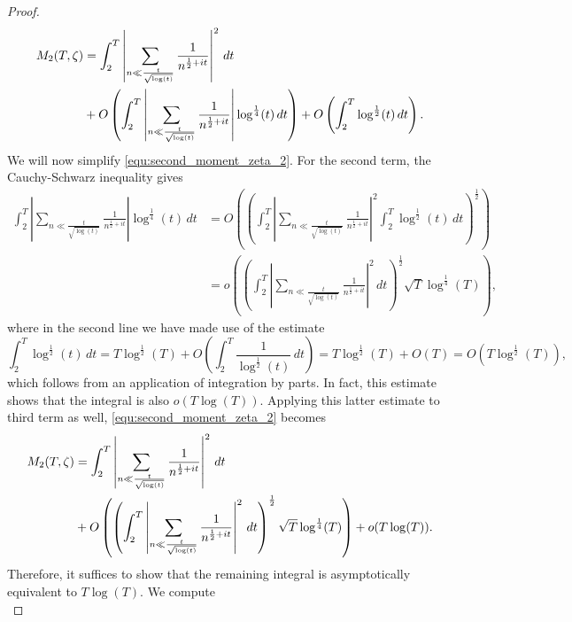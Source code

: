\begin{proof}
\begin{equation}
        \begin{aligned}
          M_{2}(T,\zeta) &= \int_{2}^{T}\left|\sum_{n \ll \frac{t}{\sqrt{\log(t)}}}\frac{1}{n^{\frac{1}{2}+it}}\right|^{2}\,dt \\
          &+ O\left(\int_{2}^{T}\left|\sum_{n \ll \frac{t}{\sqrt{\log(t)}}}\frac{1}{n^{\frac{1}{2}+it}}\right|\log^{\frac{1}{4}}(t)\,dt\right)+O\left(\int_{2}^{T}\log^{\frac{1}{2}}(t)\,dt\right).
        \end{aligned}
      \end{equation}
      We will now simplify \cref{equ:second_moment_zeta_2}. For the second term, the Cauchy-Schwarz inequality gives
      \begin{align*}
        \int_{2}^{T}\left|\sum_{n \ll \frac{t}{\sqrt{\log(t)}}}\frac{1}{n^{\frac{1}{2}+it}}\right|\log^{\frac{1}{4}}(t)\,dt &= O\left(\left(\int_{2}^{T}\left|\sum_{n \ll \frac{t}{\sqrt{\log(t)}}}\frac{1}{n^{\frac{1}{2}+it}}\right|^{2}\int_{2}^{T}\log^{\frac{1}{2}}(t)\,dt\right)^{\frac{1}{2}}\right) \\
        &= o\left(\left(\int_{2}^{T}\left|\sum_{n \ll \frac{t}{\sqrt{\log(t)}}}\frac{1}{n^{\frac{1}{2}+it}}\right|^{2}\,dt\right)^{\frac{1}{2}}\sqrt{T}\log^{\frac{1}{4}}(T)\right),
      \end{align*}
      where in the second line we have made use of the estimate
      \[
        \int_{2}^{T}\log^{\frac{1}{2}}(t)\,dt = T\log^{\frac{1}{2}}(T)+O\left(\int_{2}^{T}\frac{1}{\log^{\frac{1}{2}}(t)}\,dt\right) = T\log^{\frac{1}{2}}(T)+O(T) = O(T\log^{\frac{1}{2}}(T)),
      \]
      which follows from an application of integration by parts. In fact, this estimate shows that the integral is also $o(T\log(T))$. Applying this latter estimate to third term as well, \cref{equ:second_moment_zeta_2} becomes
      \begin{equation}\label{equ:second_moment_zeta_3}
        \begin{aligned}
          M_{2}(T,\zeta) &= \int_{2}^{T}\left|\sum_{n \ll \frac{t}{\sqrt{\log(t)}}}\frac{1}{n^{\frac{1}{2}+it}}\right|^{2}\,dt \\
          &+ O\left(\left(\int_{2}^{T}\left|\sum_{n \ll \frac{t}{\sqrt{\log(t)}}}\frac{1}{n^{\frac{1}{2}+it}}\right|^{2}\,dt\right)^{\frac{1}{2}}\sqrt{T}\log^{\frac{1}{4}}(T)\right)+o(T\log(T)).
        \end{aligned}
      \end{equation}
      Therefore, it suffices to show that the remaining integral is asymptotically equivalent to $T\log(T)$. We compute
      \begin{equation}\label{equ:second_moment_zeta_4}

\end{equation}
\end{proof}
